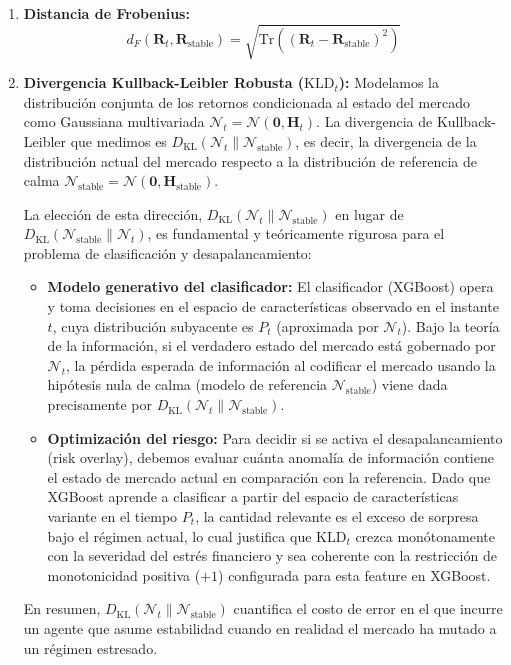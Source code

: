 \documentclass[
  12pt,
]{article}
\providecommand{\tightlist}{%
  \setlength{\itemsep}{0pt}\setlength{\parskip}{0pt}}
\begin{document}
\begin{enumerate}
\def\labelenumi{\arabic{enumi}.}
\tightlist
\item
  \textbf{Distancia de Frobenius:}
  \[d_F(\mathbf{R}_t, \mathbf{R}_{\text{stable}}) = \sqrt{\text{Tr}\left( (\mathbf{R}_t - \mathbf{R}_{\text{stable}})^2 \right)}\]
\item
  \textbf{Divergencia Kullback-Leibler Robusta (\(\text{KLD}_t\)):}
  Modelamos la distribución conjunta de los retornos condicionada al estado del mercado como Gaussiana multivariada \(\mathcal{N}_t = \mathcal{N}(\mathbf{0}, \mathbf{H}_t)\). La divergencia de Kullback-Leibler que medimos es \(D_{\text{KL}}(\mathcal{N}_t \| \mathcal{N}_{\text{stable}})\), es decir, la divergencia de la distribución actual del mercado respecto a la distribución de referencia de calma \(\mathcal{N}_{\text{stable}} = \mathcal{N}(\mathbf{0}, \mathbf{H}_{\text{stable}})\).
  
  La elección de esta dirección, \(D_{\text{KL}}(\mathcal{N}_t \| \mathcal{N}_{\text{stable}})\) en lugar de \(D_{\text{KL}}(\mathcal{N}_{\text{stable}} \| \mathcal{N}_t)\), es fundamental y teóricamente rigurosa para el problema de clasificación y desapalancamiento:
  \begin{itemize}
    \item \textbf{Modelo generativo del clasificador:} El clasificador (XGBoost) opera y toma decisiones en el espacio de características observado en el instante \(t\), cuya distribución subyacente es \(P_t\) (aproximada por \(\mathcal{N}_t\)). Bajo la teoría de la información, si el verdadero estado del mercado está gobernado por \(\mathcal{N}_t\), la pérdida esperada de información al codificar el mercado usando la hipótesis nula de calma (modelo de referencia \(\mathcal{N}_{\text{stable}}\)) viene dada precisamente por \(D_{\text{KL}}(\mathcal{N}_t \| \mathcal{N}_{\text{stable}})\).
    \item \textbf{Optimización del riesgo:} Para decidir si se activa el desapalancamiento (risk overlay), debemos evaluar cuánta anomalía de información contiene el estado de mercado actual en comparación con la referencia. Dado que XGBoost aprende a clasificar a partir del espacio de características variante en el tiempo \(P_t\), la cantidad relevante es el exceso de sorpresa bajo el régimen actual, lo cual justifica que \(\text{KLD}_t\) crezca monótonamente con la severidad del estrés financiero y sea coherente con la restricción de monotonicidad positiva (\(+1\)) configurada para esta feature en XGBoost.
  \end{itemize}
  En resumen, \(D_{\text{KL}}(\mathcal{N}_t \| \mathcal{N}_{\text{stable}})\) cuantifica el costo de error en el que incurre un agente que asume estabilidad cuando en realidad el mercado ha mutado a un régimen estresado.


\end{enumerate}
\end{document}
